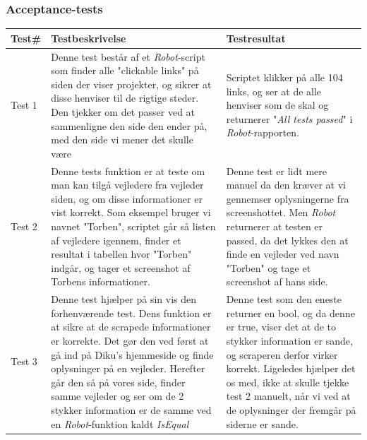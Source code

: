 \documentclass[12pt]{article}
\begin{document}
\subsubsection*{Acceptance-tests}
\begin{center}
	\begin{tabular}{|p{}|p{}|p{}|}
		\hline
	\textbf{Test\#} & \textbf{Testbeskrivelse} & \textbf{Testresultat} \\ \hline

	Test 1 & Denne test består af et \textit{Robot}-script som finder alle "clickable links" på siden der viser projekter, og sikrer at disse henviser til de rigtige steder. Den tjekker om det passer ved at sammenligne den side den ender på, med den side vi mener det skulle være & Scriptet klikker på alle 104 links, og ser at de alle henviser som de skal og returnerer "\textit{All tests passed}"{} i \textit{Robot}-rapporten.\\ \hline

	Test 2 & Denne tests funktion er at teste om man kan tilgå vejledere fra vejleder siden, og om disse informationer er vist korrekt. Som eksempel bruger vi navnet "Torben", scriptet går så listen af vejledere igennem, finder et resultat i tabellen hvor "Torben" indgår, og tager et screenshot af Torbens informationer. & Denne test er lidt mere manuel da den kræver at vi gennemser oplysningerne fra screenshottet. Men \textit{Robot} returnerer at testen er passed, da det lykkes den at finde en vejleder ved navn "Torben" og tage et screenshot af hans side.\\ \hline

	Test 3 & Denne test hjælper på sin vis den forhenværende test. Dens funktion er at sikre at de scrapede informationer er korrekte. Det gør den ved først at gå ind på Diku's hjemmeside og finde oplysninger på en vejleder. Herefter går den så på vores side, finder samme vejleder og ser om de 2 stykker information er de samme ved en \textit{Robot}-funktion kaldt \textit{IsEqual} & Denne test som den eneste returner en bool, og da denne er true, viser det at de to stykker information er sande, og scraperen derfor virker korrekt. \newline
	Ligeledes hjælper det os med, ikke at skulle tjekke test 2 manuelt, når vi ved at de oplysninger der fremgår på siderne er sande. \\ \hline
	\end{tabular}
\end{center}
\newpage
\end{document}
